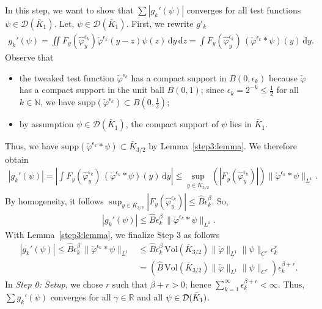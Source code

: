 In this step, we want to show that \(\sum |g_k'(\psi)|\) converges for all test functions \(\psi \in \mathcal{D}(\bar K_1)\). Let, \(\psi \in \mathcal{D}(\bar K_1)\). First, we rewrite \(g'_k\) 
\begin{align}\label{gk-formular}
    g_k'(\psi) = \iint F_y(\hat{\varphi}^{\epsilon_k}_{y}) \check \varphi^{\epsilon_k}(y-z) \psi(z) \, \mathrm{d}y \, \mathrm{d}z = \int F_y(\hat \varphi^{\epsilon_k}_y) \, (\check \varphi^{\epsilon_k} * \psi)(y) \, \mathrm{d}y.
\end{align}
Observe that 
\begin{itemize}
    \item the tweaked test function \(\check \varphi^{\epsilon_k}\) has a compact support in \(B(0, \epsilon_k)\) because \(\check \varphi\) has a compact support in the unit ball \(B(0,1)\); since \(\epsilon_k = 2^{-k} \leq \frac{1}{2}\) for all \(k \in \mathbb{N}\), we have \(\mathrm{supp} \left( \check \varphi^{\epsilon_k} \right) \subset B(0,\frac{1}{2})\);
    \item by assumption \(\psi \in \mathcal{D}(\bar K_1)\), the compact support of \(\psi\) lies in \(\bar K_1\).
\end{itemize}
Thus, we have \(\mathrm{supp} \left( \check \varphi^{\epsilon_k} * \psi \right) \subset \bar K_{3/2}\) by Lemma~\ref{step3:lemma}. We therefore obtain 
\begin{align*}
    |g_k'(\psi)| = \left|\int F_y(\hat \varphi^{\epsilon_k}_y) \, (\check \varphi^{\epsilon_k} * \psi)(y) \, \mathrm{d}y\right| 
    \leq \sup_{y \in \overline K_{3/2}} \left(|F_y(\hat \varphi^{\epsilon_k}_y)| \right) \lVert \check \varphi^{\epsilon_k} * \psi \rVert_{L^1}.
\end{align*}
By {homogeneity}, it follows \(
    \sup_{y \in \overline K_{3/2}} |F_y(\hat \varphi^{\epsilon_k}_y)|  \leq  \hat B \epsilon_k^\beta
\). 
So,
\begin{align*}
    |g_k'(\psi)| \leq \hat B \epsilon_k^\beta \, \lVert \check \varphi^{\epsilon_k} * \psi \rVert_{L^1}.
\end{align*}
With Lemma~\ref{step3:lemma}, we finalize Step 3 as follows 
\begin{align}
    |g_k'(\psi)| \leq \hat B \epsilon_k^\beta \, \lVert \check \varphi^{\epsilon_k} * \psi \rVert_{L^1} &\leq \hat B \epsilon_k^\beta \,  \mathrm{Vol}(\overline K_{3/2})  \lVert \check \varphi \rVert_{L^1} \lVert \psi \rVert_{C^r} \epsilon^r_k \nonumber \\
    &= \left( \hat B \, \mathrm{Vol}(\overline K_{3/2})  \lVert \check \varphi \rVert_{L^1} \lVert \psi \rVert_{C^r} \right)\epsilon^{\beta + r}_k. \label{Mustermkatze}
\end{align}
In \emph{Step 0: Setup}, we chose \(r\) such that  \(\beta + r > 0\); hence \(\sum_{k=1}^\infty \epsilon_k^{\beta + r} < \infty\). Thus, \(\sum g_k'(\psi)\) converges for all \(\gamma \in \mathbb{R}\) and all \(\psi \in \mathcal{D}(\bar{K}_{1})\).

